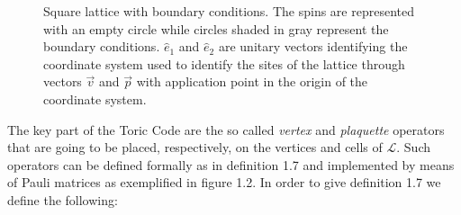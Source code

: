 \documentclass{Configuration_Files/PoliMi3i_thesis}
\begin{document}
\begin{figure}
\begin{center}
	\end{center}
	
	\caption{Square lattice with boundary conditions. The spins are represented with an empty circle while circles shaded in gray represent the boundary conditions. $\hat{e}_1$ and $\hat{e}_2$ are unitary vectors identifying the coordinate system used to identify the sites of the lattice through vectors $\vec{v}$ and $\vec{p}$ with application point in the origin of the coordinate system.}
	\label{fig:lattice}
\end{figure}

\newpage
The key part of the Toric Code are the so called \textit{vertex} and \textit{plaquette} operators that are going to be placed, respectively, on the vertices and cells of $\mathcal{L}$. Such operators can be defined formally as in definition 1.7 and implemented by means of Pauli matrices as exemplified in figure 1.2. In order to give definition 1.7 we define the following:
\end{document}
